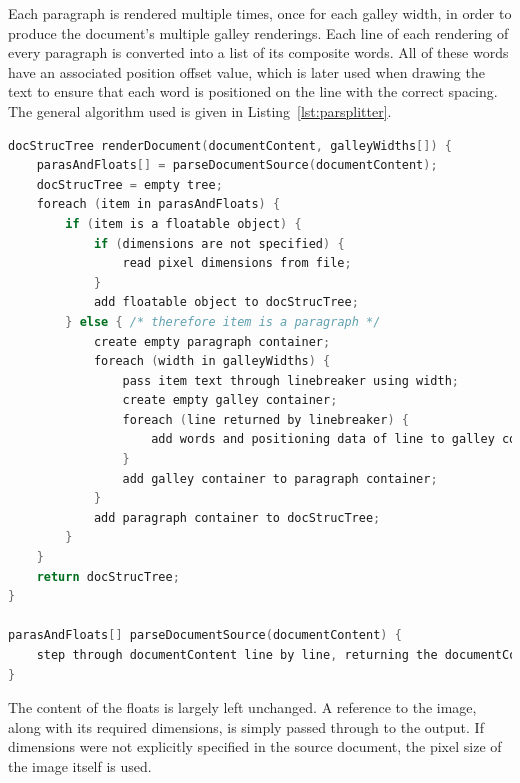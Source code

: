 Each paragraph is rendered multiple times, once for each galley width, in order to produce the document's multiple galley renderings. Each line of each rendering of every paragraph is converted into a list of its composite words. All of these words have an associated position offset value, which is later used when drawing the text to ensure that each word is positioned on the line with the correct spacing. The general algorithm used is given in Listing~\ref{lst:parsplitter}.


\begin{lstlisting}[label=lst:parsplitter,language=c,captionpos=b,float,caption={[Algorithm followed by the galley renderer]The algorithm followed by the galley renderer. Firstly the source of the document is parsed to break it into its initial logical blocks: one block per paragraph and one block per float, in the order encountered in the document source. These blocks are then processed further depending on their type. Floats may be probed for their pixel dimensions if no size was specified, and are then added to the document structure tree. Paragraphs have their content passed through a line breaking algorithm, once for each specified width.}]
docStrucTree renderDocument(documentContent, galleyWidths[]) {
    parasAndFloats[] = parseDocumentSource(documentContent);
    docStrucTree = empty tree;
    foreach (item in parasAndFloats) {
        if (item is a floatable object) {
            if (dimensions are not specified) {
                read pixel dimensions from file;
            }
            add floatable object to docStrucTree;
        } else { /* therefore item is a paragraph */
            create empty paragraph container;
            foreach (width in galleyWidths) {
                pass item text through linebreaker using width;
                create empty galley container;
                foreach (line returned by linebreaker) {
                    add words and positioning data of line to galley container;
                }
                add galley container to paragraph container;
            }
            add paragraph container to docStrucTree;
        }
    }
    return docStrucTree;
}

parasAndFloats[] parseDocumentSource(documentContent) {
    step through documentContent line by line, returning the documentContent broken into an array of strings with one element per paragraph and per floatable object;
}

\end{lstlisting}


The content of the floats is largely left unchanged. A reference to the image, along with its required dimensions, is simply passed through to the output. If dimensions were not explicitly specified in the source document, the pixel size of the image itself is used.

